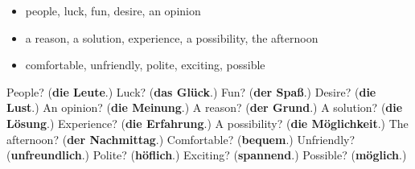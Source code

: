 \begin{itemize}
\raggedright
  \item people, luck, fun, desire, an opinion
  \item a reason, a solution, experience, a possibility, the afternoon
  \item comfortable, unfriendly, polite, exciting, possible
\end{itemize}

\begin{tcolorbox}[breakable,colback=teal!4,colframe=teal!35!black,title={Before you move on}]
People? (\textbf{die Leute}.) Luck? (\textbf{das Glück}.) Fun? (\textbf{der Spaß}.) Desire? (\textbf{die Lust}.) An opinion? (\textbf{die Meinung}.) A reason? (\textbf{der Grund}.) A solution? (\textbf{die Lösung}.) Experience? (\textbf{die Erfahrung}.) A possibility? (\textbf{die Möglichkeit}.) The afternoon? (\textbf{der Nachmittag}.) Comfortable? (\textbf{bequem}.) Unfriendly? (\textbf{unfreundlich}.) Polite? (\textbf{höflich}.) Exciting? (\textbf{spannend}.) Possible? (\textbf{möglich}.)
\end{tcolorbox}
